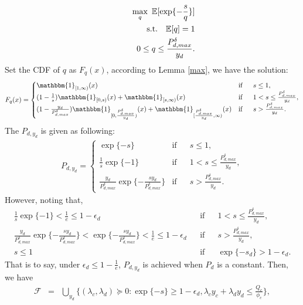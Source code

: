 \documentclass[12pt, draftclsnofoot, journal, letterpaper, onecolumn]{IEEEtran}
\begin{document}
\begin{IEEEproof}
\begin{eqnarray*}
  && \max_{q}~\mathbb{E}[\exp\{-\frac{s}{q}\}] \\
  &&{\rm s.t.}~~~ \mathbb{E}[q]=1\\
  && ~~~~~~~0\leq q\leq \frac{P_{d,max}^\delta}{y_d}.
\end{eqnarray*}
Set the CDF of $q$ as $F_{q}(x)$, according to Lemma \ref{max}, we have the solution:
\begin{eqnarray*}
F_{q}(x)=
\begin{cases}
\mathbbm{1}_{[1,\infty)}(x) & \text{if} \phantom{aaa} s\leq 1,\\
(1-\frac{1}{s})\mathbbm{1}_{[0,s)}(x)+\mathbbm{1}_{[s,\infty)}(x) & \text{if} \phantom{aaa} 1<s\leq\frac{P_{d,max}^\delta}{y_d},\\
(1-\frac{y_d}{P_{d,max}^\delta})\mathbbm{1}_{[0,\frac{P_{d,max}^\delta}{y_d})}(x)+\mathbbm{1}_{[\frac{P_{d,max}^\delta}{y_d},\infty)}(x) & \text{if} \phantom{aaa} s>\frac{P_{d,max}^\delta}{y_d}.
\end{cases}
\end{eqnarray*}
The $P_{d,y_d}$ is given as following:
\begin{eqnarray}\label{pdyd}
P_{d,y_d}=
\begin{cases}
\exp\{-s\} & \text{if} \phantom{aaa} s\leq 1,\\
\frac{1}{s}\exp\{-1\} & \text{if} \phantom{aaa} 1<s\leq\frac{P_{d,max}^\delta}{y_d},\\
\frac{y_d}{P_{d,max}^\delta}\exp\{-\frac{sy_d}{P_{d,max}^\delta}\}  & \text{if} \phantom{aaa} s>\frac{P_{d,max}^\delta}{y_d}.
\end{cases}
\end{eqnarray}
However, noting that,
\begin{eqnarray*}
\frac{1}{s}\exp\{-1\}<\frac{1}{e}\leq1-\epsilon_d && \text{if} \phantom{aaa} 1<s\leq\frac{P_{d,max}^\delta}{y_d},\\
\frac{y_d}{P_{d,max}^\delta}\exp\{-\frac{sy_d}{P_{d,max}^\delta}\}<\exp\{-\frac{sy_d}{P_{d,max}^\delta}\}<\frac{1}{e}\leq1-\epsilon_d && \text{if} \phantom{aaa} s >\frac{P_{d,max}^\delta}{y_d},\\
s\leq1 && \text{if} \phantom{aaa} \exp\{-s_d\}>1-\epsilon_d.
\end{eqnarray*}
That is to say, under $\epsilon_d\leq1-\frac{1}{e}$, $P_{d,y_d}$ is achieved when $P_d$ is a constant.
Then, we have
\begin{eqnarray*}
\mathcal{F}&=&\bigcup_{y_d}\big\{(\lambda_c,\lambda_d)\succeq0:\exp\{-s\}\geq1-\epsilon_d,\lambda_cy_c+\lambda_dy_d \leq \frac{Q_c}{\phi_c}\big\},\label{CPC}\\

\end{eqnarray*}
\end{IEEEproof}
\end{document}
